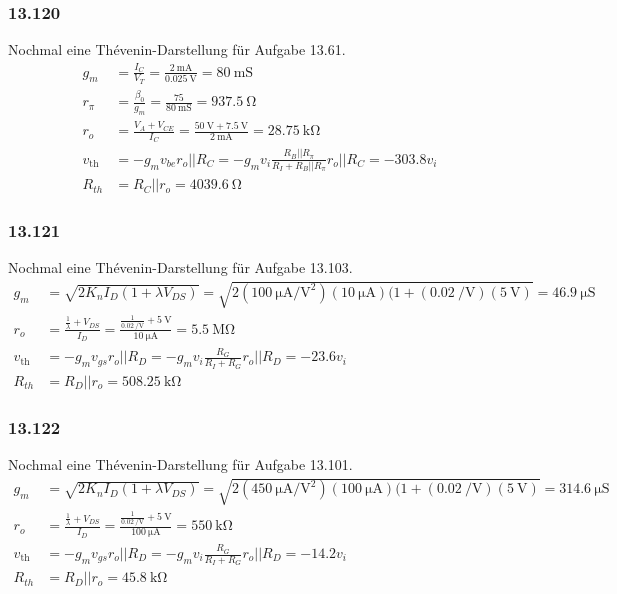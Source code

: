 \documentclass[11pt,a4paper,titlepage]{article}
\begin{document}
\subsubsection*{13.120}
Nochmal eine Thévenin-Darstellung für Aufgabe 13.61.
\begin{equation}
\begin{aligned}
g_m &= \frac{I_C}{V_T} = \frac{\SI{2}{\milli\ampere}}{\SI{0.025}{\volt}} = \SI{80}{\milli\siemens} \\
r_{\pi} &= \frac{\beta_0}{g_m} = \frac{75}{\SI{80}{\milli\siemens}} = \SI{937.5}{\ohm} \\
r_o &= \frac{V_A+V_{CE}}{I_C} = \frac{\SI{50}{\volt} + \SI{7.5}{\volt}}{\SI{2}{\milli\ampere}} = \SI{28.75}{\kilo\ohm} \\
v_{\text{th}} &= -g_mv_{be}r_o||R_C = -g_mv_i\frac{R_B||R_{\pi}}{R_I + R_B||R_{\pi}}r_o||R_C = -303.8v_i \\
R_{th} &= R_C||r_o = \SI{4039.6}{\ohm}
\end{aligned}
\end{equation}

\subsubsection*{13.121}
Nochmal eine Thévenin-Darstellung für Aufgabe 13.103.
\begin{equation}
\begin{aligned}
g_m &= \sqrt{2K_nI_D(1+\lambda V_{DS})} = \sqrt{2(\SI{100}{\micro\ampere\per\square\volt})(\SI{10}{\micro\ampere})(1+(\SI{0.02}{\per\volt})(\SI{5}{\volt})} = \SI{46.9}{\micro\siemens} \\
r_o &= \frac{\frac{1}{\lambda}+V_{DS}}{I_D} = \frac{\frac{1}{\SI{0.02}{\per\volt}}+\SI{5}{\volt}}{\SI{10}{\micro\ampere}} = \SI{5.5}{\mega\ohm} \\
v_{\text{th}} &= -g_mv_{gs}r_o||R_D = -g_mv_i\frac{R_G}{R_I + R_G}r_o||R_D = -23.6v_i \\
R_{th} &= R_D||r_o = \SI{508.25}{\kilo\ohm}
\end{aligned}
\end{equation}

\subsubsection*{13.122}
Nochmal eine Thévenin-Darstellung für Aufgabe 13.101.
\begin{equation}
\begin{aligned}
g_m &= \sqrt{2K_nI_D(1+\lambda V_{DS})} = \sqrt{2(\SI{450}{\micro\ampere\per\square\volt})(\SI{100}{\micro\ampere})(1+(\SI{0.02}{\per\volt})(\SI{5}{\volt})} = \SI{314.6}{\micro\siemens} \\
r_o &= \frac{\frac{1}{\lambda}+V_{DS}}{I_D} = \frac{\frac{1}{\SI{0.02}{\per\volt}}+\SI{5}{\volt}}{\SI{100}{\micro\ampere}} = \SI{550}{\kilo\ohm} \\
v_{\text{th}} &= -g_mv_{gs}r_o||R_D = -g_mv_i\frac{R_G}{R_I + R_G}r_o||R_D = -14.2v_i \\
R_{th} &= R_D||r_o = \SI{45.8}{\kilo\ohm}
\end{aligned}
\end{equation}
\end{document}

